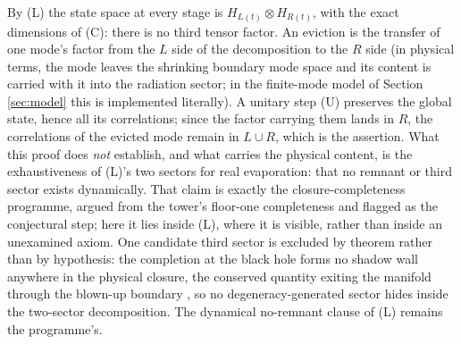 By (L) the state space at every stage is $H_{L(t)} \otimes H_{R(t)}$, with the exact dimensions of (C): there is no third tensor factor. An eviction is the transfer of one mode's factor from the $L$ side of the decomposition to the $R$ side (in physical terms, the mode leaves the shrinking boundary mode space and its content is carried with it into the radiation sector; in the finite-mode model of Section \ref{sec:model} this is implemented literally). A unitary step (U) preserves the global state, hence all its correlations; since the factor carrying them lands in $R$, the correlations of the evicted mode remain in $L \cup R$, which is the assertion. What this proof does \emph{not} establish, and what carries the physical content, is the exhaustiveness of (L)'s two sectors for real evaporation: that no remnant or third sector exists dynamically. That claim is exactly the closure-completeness programme, argued from the tower's floor-one completeness \cite[Cor.~6.2]{ButlerT3} and flagged as the conjectural step; here it lies inside (L), where it is visible, rather than inside an unexamined axiom. One candidate third sector is excluded by theorem rather than by hypothesis: the completion at the black hole forms no shadow wall anywhere in the physical closure, the conserved quantity exiting the manifold through the blown-up boundary \cite[Thm.~8.12, Rem.~8.13]{ButlerT4}, so no degeneracy-generated sector hides inside the two-sector decomposition. The dynamical no-remnant clause of (L) remains the programme's.
